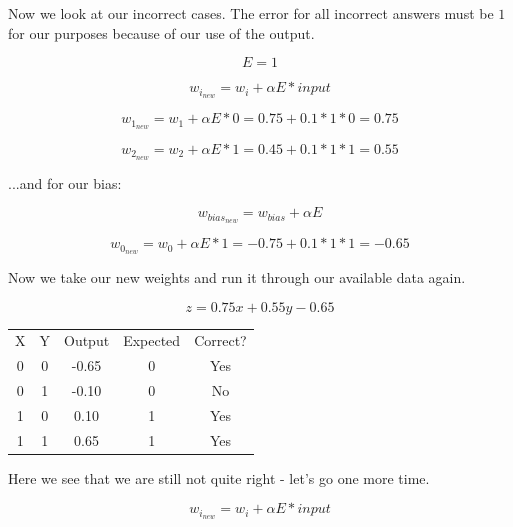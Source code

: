 \documentclass{article}
\begin{document}
\noindent Now we look at our incorrect cases. The error for all incorrect answers must be $1$ for our purposes because of our use of the output.

\begin{equation}
    E = 1    
\end{equation}

\begin{equation}
    w_{i_{new}} = w_i + \alpha E * input
\end{equation}

\begin{equation}
    w_{1_{new}} = w_1 + \alpha E * 0 = 0.75 + 0.1*1*0 = 0.75
\end{equation}

\begin{equation}
    w_{2_{new}} = w_2 + \alpha E * 1 = 0.45 + 0.1*1*1 = 0.55
\end{equation}

\noindent ...and for our bias:

\begin{equation}
    w_{{bias}_{new}} = w_{bias} + \alpha E
\end{equation}

\begin{equation}
    w_{0_{new}} = w_0 + \alpha E * 1 = -0.75 + 0.1*1*1 = -0.65
\end{equation}

\noindent Now we take our new weights and run it through our available data again.

\begin{equation}
    z=0.75x+0.55y-0.65
\end{equation}

\begin{center}
    \begin{tabular}{c c c c c}
        X & Y & Output & Expected & Correct?\\
        0 & 0 & -0.65 & 0 & Yes\\
        0 & 1 & -0.10 & 0 & No\\
        1 & 0 & 0.10 & 1 & Yes\\
        1 & 1 & 0.65 & 1 & Yes\\
    \end{tabular}
\end{center}

\noindent Here we see that we are still not quite right - let's go one more time.

\begin{equation}
    w_{i_{new}} = w_i + \alpha E * input
\end{equation}
\end{document}

